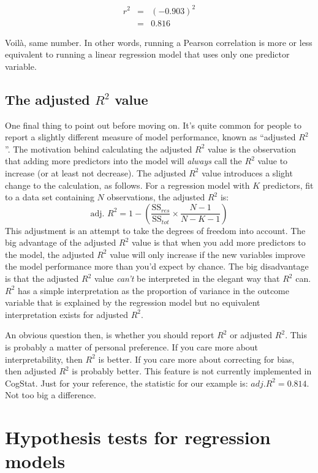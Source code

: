 \documentclass[
  11pt,
  a4paper,
  twoside,symmetric,openright]{book}
\theoremstyle{break}
\theoremstyle{break}
\begin{document}
\[
\begin{array}{rcl}
r^2 &=& (-0.903)^2
    \\
    &=& 0.816
\end{array}
\]

Voilà, same number. In other words, running a Pearson correlation is more or less equivalent to running a linear regression model that uses only one predictor variable.

\subsection{\texorpdfstring{The adjusted \(R^2\) value}{The adjusted R\^{}2 value}}\label{the-adjusted-r2-value}

One final thing to point out before moving on. It's quite common for people to report a slightly different measure of model performance, known as ``adjusted \(R^2\)''. The motivation behind calculating the adjusted \(R^2\) value is the observation that adding more predictors into the model will \emph{always} call the \(R^2\) value to increase (or at least not decrease). The adjusted \(R^2\) value introduces a slight change to the calculation, as follows. For a regression model with \(K\) predictors, fit to a data set containing \(N\) observations, the adjusted \(R^2\) is:
\[
\mbox{adj. } R^2 = 1 - \left(\frac{\mbox{SS}_{res}}{\mbox{SS}_{tot}} \times \frac{N-1}{N-K-1} \right)
\]
This adjustment is an attempt to take the degrees of freedom into account. The big advantage of the adjusted \(R^2\) value is that when you add more predictors to the model, the adjusted \(R^2\) value will only increase if the new variables improve the model performance more than you'd expect by chance. The big disadvantage is that the adjusted \(R^2\) value \emph{can't} be interpreted in the elegant way that \(R^2\) can. \(R^2\) has a simple interpretation as the proportion of variance in the outcome variable that is explained by the regression model but no equivalent interpretation exists for adjusted \(R^2\).

An obvious question then, is whether you should report \(R^2\) or adjusted \(R^2\). This is probably a matter of personal preference. If you care more about interpretability, then \(R^2\) is better. If you care more about correcting for bias, then adjusted \(R^2\) is probably better. This feature is not currently implemented in CogStat. Just for your reference, the statistic for our example is: \(adj. R^2 = 0.814\). Not too big a difference.

\section{Hypothesis tests for regression models}\label{regressiontests}
\end{document}
